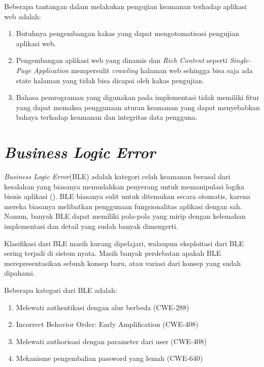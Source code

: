Beberapa tantangan dalam melakukan pengujian keamanan terhadap aplikasi web adalah:
\begin{enumerate}
    \item Butuhnya pengembangan kakas yang dapat mengotomatisasi pengujian aplikasi web.
    
    \item Pengembangan aplikasi web yang dinamis dan \emph{Rich Content} seperti \emph{Single-Page Application}
    mempersulit \emph{crawling} halaman web sehingga bisa saja ada state halaman yang
    tidak bisa dicapai oleh kakas pengujian.

    \item Bahasa pemrograman yang digunakan pada implementasi tidak memiliki fitur yang
    dapat memaksa penggunaan aturan keamanan yang dapat menyebabkan bahaya terhadap keamanan
    dan integritas data pengguna.
\end{enumerate}

\section{\emph{Business Logic Error}}

\emph{Business Logic Error}(BLE) adalah kategori celah keamanan berasal dari kesalahan
yang biasanya memudahkan penyerang untuk memanipulasi logika bisnis aplikasi (\cite{ble_cwe}).
BLE biasanya sulit untuk ditemukan secara otomatis, karena mereka biasanya melibatkan
penggunaan fungsionalitas aplikasi dengan sah. Namun, banyak BLE dapat memiliki
pola-pola yang mirip dengan kelemahan implementasi dan detail yang sudah banyak dimengerti.

Klasifikasi dari BLE masih kurang dipelajari, walaupun eksploitasi dari BLE
sering terjadi di sistem nyata. Masih banyak perdebatan apakah BLE merepresentasikan
sebuah konsep baru, atau variasi dari konsep yang sudah dipahami.

Beberapa kategori dari BLE adalah:

\begin{enumerate}
    \item Melewati authentikasi dengan alur berbeda (CWE-288)
    \item Incorrect Behavior Order: Early Amplification (CWE-408)
    \item Melewati authorisasi dengan parameter dari user (CWE-408)
    \item Mekanisme pengembalian password yang lemah (CWE-640)
\end{enumerate}

